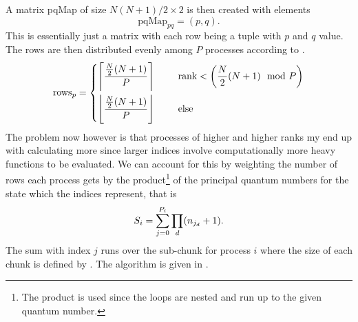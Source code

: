     A matrix pqMap of size $N(N+1)/2\times 2$ is then created with elements
        \begin{equation}
            \text{pqMap}_{pq} = (p,q).
        \end{equation}
    This is essentially just a matrix with each row being a tuple with $p$ and
    $q$ value. \\
    The rows are then distributed evenly among $P$ processes according to
    .
        \begin{equation}
            \text{rows}_{p} = \left\{\begin{aligned}
                \left\lceil\frac{\frac{N}{2}(N+1)}{P}\right\rceil &\indent&
                &\text{rank} < \left(\frac{N}{2}(N+1)\mod P\right) \\
                \left\lfloor\frac{\frac{N}{2}(N+1)}{P}\right\rfloor
                &\indent& &\text{else}
                \end{aligned}\right.
            \label{eq:divideeven}
        \end{equation}
    The problem now however is that processes of higher and higher ranks my end
    up with calculating more since larger indices involve computationally more
    heavy functions to be evaluated. We can account for this by weighting the
    number of rows each process gets by the product\footnote{The product is
    used since the loops are nested and run up to the given quantum number.} of
    the principal quantum numbers for the state which the indices represent,
    that is
        \begin{equation}
            S_i = \suml{j=0}{P_i} \prod_d (n_{j_d}+1).
            \label{eq:Sdefpar}
        \end{equation}
    The sum with index $j$ runs over the sub-chunk for process $i$ where the
    size of each chunk is defined by .  The algorithm is
    given in .
